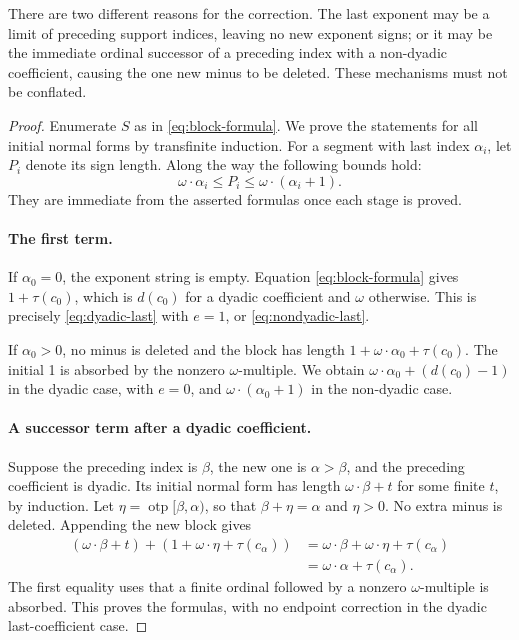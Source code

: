\documentclass[11pt,letterpaper]{article}
\theoremstyle{definition}
\theoremstyle{remark}
\DeclareMathOperator{\otp}{otp}
\begin{document}
There are two different reasons for the correction. The last exponent
may be a limit of preceding support indices, leaving no new exponent
signs; or it may be the immediate ordinal successor of a preceding index
with a non-dyadic coefficient, causing the one new minus to be deleted.
These mechanisms must not be conflated.

\begin{proof}
Enumerate \(S\) as in \eqref{eq:block-formula}. We prove the statements
for all initial normal forms by transfinite induction. For a segment with
last index \(\alpha_i\), let \(P_i\) denote its sign length. Along the
way the following bounds hold:
\begin{equation}\label{eq:prefix-bounds}
 \omega\cdot\alpha_i\leq P_i
       \leq\omega\cdot(\alpha_i+1).
\end{equation}
They are immediate from the asserted formulas once each stage is proved.

\paragraph{The first term.}
If \(\alpha_0=0\), the exponent string is empty. Equation
\eqref{eq:block-formula} gives \(1+\tau(c_0)\), which is \(d(c_0)\)
for a dyadic coefficient and \(\omega\) otherwise. This is precisely
\eqref{eq:dyadic-last} with \(e=1\), or
\eqref{eq:nondyadic-last}.

If \(\alpha_0>0\), no minus is deleted and the block has length
\(1+\omega\cdot\alpha_0+\tau(c_0)\). The initial 1 is absorbed by the
nonzero \(\omega\)-multiple. We obtain
\(\omega\cdot\alpha_0+(d(c_0)-1)\) in the dyadic case, with \(e=0\),
and \(\omega\cdot(\alpha_0+1)\) in the non-dyadic case.

\paragraph{A successor term after a dyadic coefficient.}
Suppose the preceding index is \(\beta\), the new one is \(\alpha>\beta\),
and the preceding coefficient is dyadic. Its initial normal form has
length \(\omega\cdot\beta+t\) for some finite \(t\), by induction.
Let \(\eta=\otp[\beta,\alpha)\), so that
\(\beta+\eta=\alpha\) and \(\eta>0\). No extra minus is deleted.
Appending the new block gives
\begin{align*}
 (\omega\cdot\beta+t)+(1+\omega\cdot\eta+\tau(c_\alpha))
 &=\omega\cdot\beta+\omega\cdot\eta+\tau(c_\alpha)\\
 &=\omega\cdot\alpha+\tau(c_\alpha).
\end{align*}
The first equality uses that a finite ordinal followed by a nonzero
\(\omega\)-multiple is absorbed. This proves the formulas, with no
endpoint correction in the dyadic last-coefficient case.


\end{proof}
\end{document}
